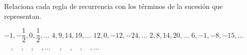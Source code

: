 \question[10] Relaciona cada regla de recurrencia con los términos de la sucesión que representan.

\begin{multicols}{2}
    \columnbreak
    \begin{choices}
        \choice $-1, -\dfrac{1}{2}, 0, \dfrac{1}{2},\dots $
        \choice $4, 9, 14, 19, \dots$
        \choice $12, 0, -12, -24, \dots$
        \choice $2, 8, 14, 20, \dots$
        \choice $6, -1, -8, -15, \dots$
        \choice $\quad,\quad,\quad,\quad, \dots $
        \choice $\quad,\quad,\quad,\quad, \dots $
    \end{choices}
\end{multicols}